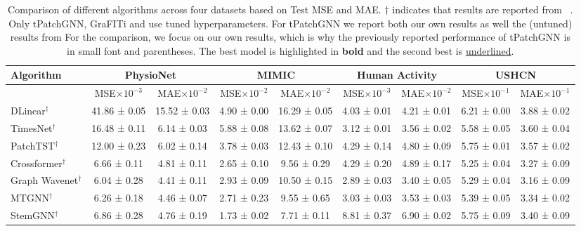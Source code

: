 \begin{table*}[ht]
    \centering
    \caption{Comparison of different algorithms across four datasets based on Test MSE and MAE.\@ 
            $\dagger$ indicates that results are reported from \citeauthor{Zhang.Irregular}~\cite{Zhang.Irregular}.
            Only tPatchGNN, GraFITi and \model{} use tuned hyperparameters. 
            For tPatchGNN we report both our own results as well the (untuned) results from \citeauthor{Zhang.Irregular}
            For the comparison, we focus on our own results, which is why the previously reported performance of tPatchGNN is in small font and parentheses.
            The best model is highlighted in \large \textbf{bold} \normalsize and the second best is \underline{underlined}.  
            }\label{tab:main} 
    \begin{tabular}{l cc cc cc cc}
        \toprule
        Algorithm & \multicolumn{2}{c}{PhysioNet} & \multicolumn{2}{c}{MIMIC} & \multicolumn{2}{c}{Human Activity} & \multicolumn{2}{c}{USHCN} \\ 
        \midrule
        & MSE$\times 10^{-3}$ & MAE$\times 10^{-2}$ & MSE$\times 10^{-2}$ & MAE$\times 10^{-2}$ & MSE$\times 10^{-3}$ & MAE$\times 10^{-2}$ & MSE$\times 10^{-1}$ & MAE$\times 10^{-1}$ \\ 
        \midrule
        DLinear$^\dagger$ & 41.86 ± 0.05 & 15.52 ± 0.03 & 4.90 ± 0.00 & 16.29 ± 0.05 & 4.03 ± 0.01 & 4.21 ± 0.01 & 6.21 ± 0.00 & 3.88 ± 0.02 \\ 
        TimesNet$^\dagger$ & 16.48 ± 0.11 & 6.14 ± 0.03 & 5.88 ± 0.08 & 13.62 ± 0.07 & 3.12 ± 0.01 & 3.56 ± 0.02 & 5.58 ± 0.05 & 3.60 ± 0.04 \\ 
        PatchTST$^\dagger$ & 12.00 ± 0.23 & 6.02 ± 0.14 & 3.78 ± 0.03 & 12.43 ± 0.10 & 4.29 ± 0.14 & 4.80 ± 0.09 & 5.75 ± 0.01 & 3.57 ± 0.02 \\ 
        Crossformer$^\dagger$ & 6.66 ± 0.11 & 4.81 ± 0.11 & 2.65 ± 0.10 & 9.56 ± 0.29 & 4.29 ± 0.20 & 4.89 ± 0.17 & 5.25 ± 0.04 & 3.27 ± 0.09 \\
        Graph Wavenet$^\dagger$  & 6.04 ± 0.28 & 4.41 ± 0.11 & 2.93 ± 0.09 & 10.50 ± 0.15 & 2.89 ± 0.03 & 3.40 ± 0.05 & 5.29 ± 0.04 & 3.16 ± 0.09 \\ 
        MTGNN$^\dagger$ & 6.26 ± 0.18 & 4.46 ± 0.07 & 2.71 ± 0.23 & 9.55 ± 0.65 & 3.03 ± 0.03 & 3.53 ± 0.03 & 5.39 ± 0.05 & 3.34 ± 0.02 \\ 
        StemGNN$^\dagger$ & 6.86 ± 0.28 & 4.76 ± 0.19 & 1.73 ± 0.02 & 7.71 ± 0.11 & 8.81 ± 0.37 & 6.90 ± 0.02 & 5.75 ± 0.09 & 3.40 ± 0.09 \\ 

\end{tabular}
\end{table*}
